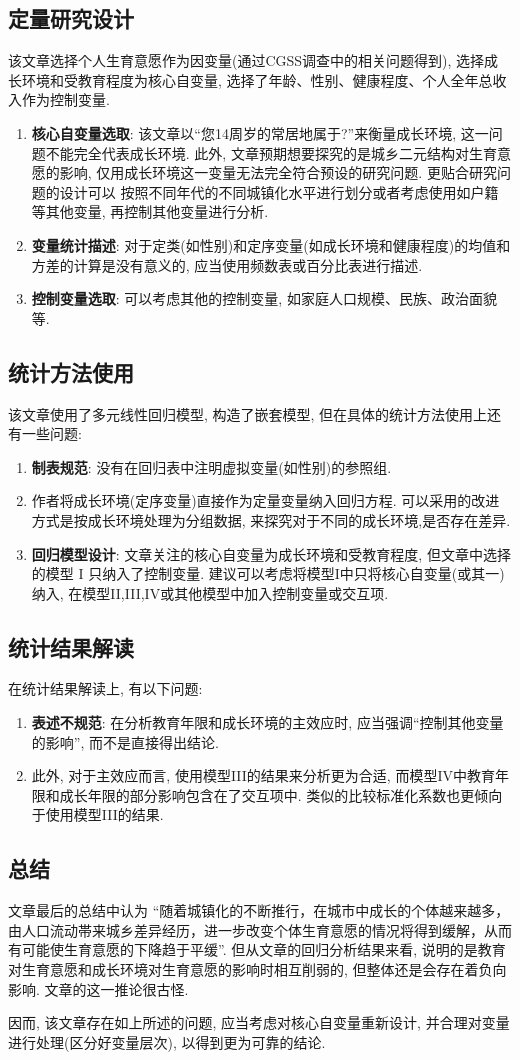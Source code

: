 \documentclass[11pt]{article}
\newcommand\1{\mathds{1}}
\begin{document}
\subsection{定量研究设计}
    该文章选择个人生育意愿作为因变量(通过CGSS调查中的相关问题得到), 选择成长环境和受教育程度为核心自变量, 选择了年龄、性别、健康程度、个人全年总收入作为控制变量.
    \begin{enumerate}[label=(\arabic*)]
        \item \textbf{核心自变量选取}: 该文章以“您14周岁的常居地属于?”来衡量成长环境, 这一问题不能完全代表成长环境. 此外, 文章预期想要探究的是城乡二元结构对生育意愿的影响, 仅用成长环境这一变量无法完全符合预设的研究问题. 更贴合研究问题的设计可以 按照不同年代的不同城镇化水平进行划分或者考虑使用如户籍等其他变量, 再控制其他变量进行分析.
        \item \textbf{变量统计描述}: 对于定类(如性别)和定序变量(如成长环境和健康程度)的均值和方差的计算是没有意义的, 应当使用频数表或百分比表进行描述.
        \item \textbf{控制变量选取}: 可以考虑其他的控制变量, 如家庭人口规模、民族、政治面貌等. 
    \end{enumerate}
\subsection{统计方法使用}
    该文章使用了多元线性回归模型, 构造了嵌套模型, 但在具体的统计方法使用上还有一些问题:
    \begin{enumerate}[label=(\arabic*)]
        \item \textbf{制表规范}: 没有在回归表中注明虚拟变量(如性别)的参照组.
        \item 作者将成长环境(定序变量)直接作为定量变量纳入回归方程. 可以采用的改进方式是按成长环境处理为分组数据, 来探究对于不同的成长环境,是否存在差异.
        \item \textbf{回归模型设计}: 文章关注的核心自变量为成长环境和受教育程度, 但文章中选择的模型 I 只纳入了控制变量. 建议可以考虑将模型I中只将核心自变量(或其一)纳入, 在模型II,III,IV或其他模型中加入控制变量或交互项.
    \end{enumerate}
\subsection{统计结果解读}
    在统计结果解读上, 有以下问题:
    \begin{enumerate}[label=(\arabic*)]
        \item \textbf{表述不规范}: 在分析教育年限和成长环境的主效应时, 应当强调“控制其他变量的影响”, 而不是直接得出结论.
        \item 此外, 对于主效应而言, 使用模型III的结果来分析更为合适, 而模型IV中教育年限和成长年限的部分影响包含在了交互项中. 类似的比较标准化系数也更倾向于使用模型III的结果.
    \end{enumerate}
\subsection{总结}
    文章最后的总结中认为 “随着城镇化的不断推行，在城市中成长的个体越来越多，由人口流动帯来城乡差异经历，进一步改变个体生育意愿的情况将得到缓解，从而有可能使生育意愿的下降趋于平缓”. 
    但从文章的回归分析结果来看, 说明的是教育对生育意愿和成长环境对生育意愿的影响时相互削弱的, 但整体还是会存在着负向影响. 文章的这一推论很古怪. 

    因而, 该文章存在如上所述的问题, 应当考虑对核心自变量重新设计, 并合理对变量进行处理(区分好变量层次), 以得到更为可靠的结论.
\end{document}
